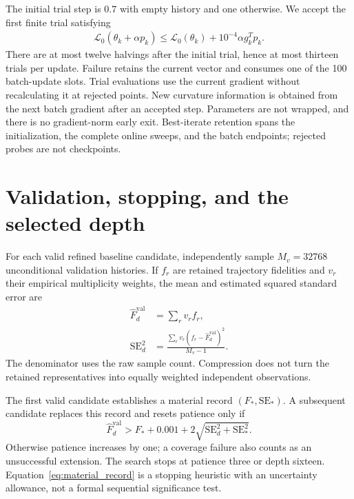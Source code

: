 The initial trial step is $0.7$ with empty history and one otherwise. We accept the first finite trial satisfying
\begin{equation}
\begin{split}
    \mathcal L_0(\theta_k+\alpha p_k)
    \leq\mathcal L_0(\theta_k)
    +10^{-4}\alpha g_k^Tp_k.
\end{split}
    \label{eq:armijo}
\end{equation}
There are at most twelve halvings after the initial trial, hence at most thirteen trials per update. Failure retains the current vector and consumes one of the 100 batch-update slots. Trial evaluations use the current gradient without recalculating it at rejected points. New curvature information is obtained from the next batch gradient after an accepted step. Parameters are not wrapped, and there is no gradient-norm early exit. Best-iterate retention spans the initialization, the complete online sweeps, and the batch endpoints; rejected probes are not checkpoints.

\section{Validation, stopping, and the selected depth}
\label{app:selection}

For each valid refined baseline candidate, independently sample $M_v=32768$ unconditional validation histories. If $f_r$ are retained trajectory fidelities and $v_r$ their empirical multiplicity weights, the mean and estimated squared standard error are
\begin{align}
    \widehat F_d^{\mathrm{val}}&=\sum_rv_rf_r,\\
    \mathrm{SE}_d^2&=\frac{\sum_rv_r(f_r-\widehat F_d^{\mathrm{val}})^2}{M_v-1}.
    \label{eq:validation_se}
\end{align}
The denominator uses the raw sample count. Compression does not turn the retained representatives into equally weighted independent observations.

The first valid candidate establishes a material record $(F_*,\mathrm{SE}_*)$. A subsequent candidate replaces this record and resets patience only if
\begin{equation}
    \widehat F_d^{\mathrm{val}}>F_*+0.001
    +2\sqrt{\mathrm{SE}_d^2+\mathrm{SE}_*^2}.
    \label{eq:material_record}
\end{equation}
Otherwise patience increases by one; a coverage failure also counts as an unsuccessful extension. The search stops at patience three or depth sixteen. Equation~\eqref{eq:material_record} is a stopping heuristic with an uncertainty allowance, not a formal sequential significance test.

